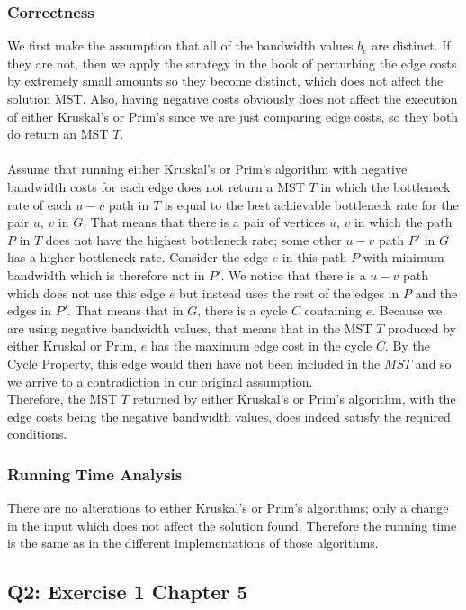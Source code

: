\documentclass[12pt, oneside]{article}
\begin{document}
\subsubsection*{Correctness}
We first make the assumption that all of the bandwidth values $b_e$ are distinct. If they are not, then we apply the strategy in the book of perturbing the edge costs by extremely small amounts so they become distinct, which does not affect the solution MST. Also, having negative costs obviously does not affect the execution of either Kruskal's or Prim's since we are just comparing edge costs, so they both do return an MST $T$.\\\\ 	
Assume that running either Kruskal's or Prim's algorithm with negative bandwidth costs for each edge does not return a MST $T$ in which the bottleneck rate of each $u-v$ path in $T$ is equal to the best achievable bottleneck rate for the pair $u$, $v$ in $G$. That means that there is a pair of vertices $u$, $v$ in which the path $P$ in $T$ does not have the highest bottleneck rate; some other $u-v$ path $P'$ in $G$ has a higher bottleneck rate. Consider the edge $e$ in this path $P$ with minimum bandwidth which is therefore not in $P'$. We notice that there is a $u-v$ path which does not use this edge $e$ but instead uses the rest of the edges in $P$ and the edges in $P'$. That means that in $G$, there is a cycle $C$ containing $e$. Because we are using negative bandwidth values, that means that in the MST $T$ produced by either Kruskal or Prim, $e$ has the maximum edge cost in the cycle $C$. By the Cycle Property, this edge would then have not been included in the $MST$ and so we arrive to a contradiction in our original assumption.\\
Therefore, the MST $T$ returned by either Kruskal's or Prim's algorithm, with the edge costs being the negative bandwidth values, does indeed satisfy the required conditions. 

\subsubsection*{Running Time Analysis}
There are no alterations to either Kruskal's or Prim's algorithms; only a change in the input which does not affect the solution found. Therefore the running time is the same as in the different implementations of those algorithms. 


\subsection*{Q2: Exercise 1 Chapter 5}
\end{document}
